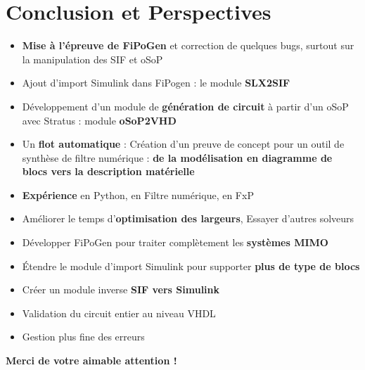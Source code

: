 \section{Conclusion et Perspectives}
\hspace*{2cm}
\frame{\tableofcontents[currentsection]}
\begin{frame} 
\begin{itemize}
 
\item \textbf{Mise à l'épreuve de FiPoGen} et correction de quelques bugs, surtout sur la manipulation des SIF et oSoP
\item Ajout d'import Simulink dans FiPogen : le module \textbf{SLX2SIF}
\item Développement d'un module de \textbf{génération de circuit} à partir d'un oSoP avec Stratus : module \textbf{oSoP2VHD}
\item Un \textbf{flot automatique} : Création d'un preuve de concept pour un outil de synthèse de filtre numérique : \textbf{de la modélisation en diagramme de blocs vers la description matérielle}
\item \textbf{Expérience} en Python, en Filtre numérique, en FxP
\end{itemize}
\end{frame} 
\begin{frame} 
\begin{itemize}
\item Améliorer le temps d'\textbf{optimisation des largeurs}, Essayer d'autres solveurs
\item Développer FiPoGen pour traiter complètement les \textbf{systèmes MIMO}
\item Étendre le module d'import Simulink pour supporter \textbf{plus de type de blocs}
\item Créer un module inverse \textbf{SIF vers Simulink}
\item Validation du circuit entier au niveau VHDL
\item Gestion plus fine des erreurs
\end{itemize}
\end{frame}

\begin{frame} 
	\begin{center}
	\huge \textbf{Merci de votre aimable attention !}
	\end{center}
	
	\begin{center}
	\end{center}
\end{frame}



 
